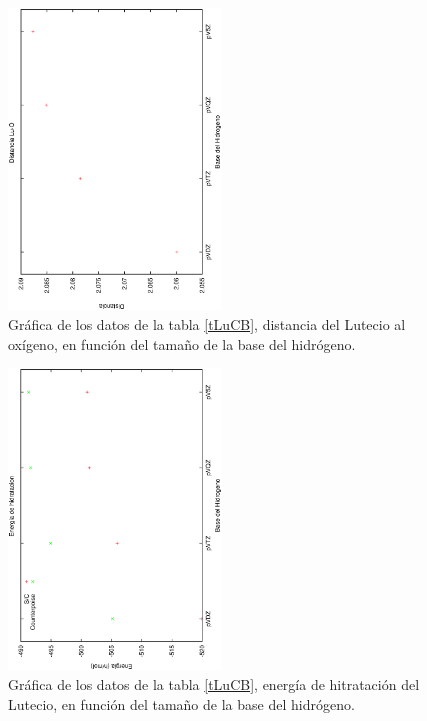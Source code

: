 \begin{figure}[h]
\centering
\includegraphics[height=8cm,angle=-90]{../Tablas/luCBdist.ps}
\caption{\small{Gr\'afica de los datos de la tabla \ref{tLuCB},
distancia del Lutecio al ox\'igeno, en funci\'on del tama\~no
de la base del hidr\'ogeno.}}
\label{fLuCBD}
\end{figure}
\begin{figure}[h]
\centering
\includegraphics[height=8cm,angle=-90]{../Tablas/luCBeneh.ps}
\caption{\small{Gr\'afica de los datos de la tabla \ref{tLuCB},
energ\'ia de hitrataci\'on del Lutecio, en funci\'on del tama\~no
de la base del hidr\'ogeno.}}
\label{fLuCBE}
\end{figure}
{\normalsize
}
{\normalsize
}
